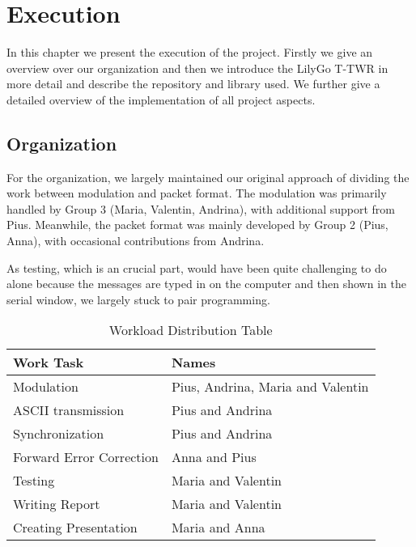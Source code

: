 \chapter{Execution}

In this chapter we present the execution of the project. Firstly we give an overview over our organization and then we introduce the LilyGo T-TWR in more detail and describe the repository and library used. We further give a detailed overview of the implementation of all project aspects.

\section{Organization}
For the organization, we largely maintained our original approach of dividing the work between modulation and packet format. The modulation was primarily handled by Group 3 (Maria, Valentin, Andrina), with additional support from Pius. Meanwhile, the packet format was mainly developed by Group 2 (Pius, Anna), with occasional contributions from Andrina.

As testing, which is an crucial part, would have been quite challenging to do alone because the messages are typed in on the computer and then shown in the serial window, we largely stuck to pair programming. 

\begin{table}[h]
    \centering
    \renewcommand{\arraystretch}{1.3} %
    \begin{tabular}{|p{7cm}|p{7cm}|}
        \hline
        \textbf{Work Task} & \textbf{Names} \\
        \hline
        Modulation & Pius, Andrina, Maria and Valentin \\
        \hline
        ASCII transmission  & Pius and Andrina \\
        \hline
        Synchronization  & Pius and Andrina \\
        \hline
        Forward Error Correction  & Anna and Pius \\
        \hline
        Testing & Maria and Valentin \\
        \hline
        Writing Report & Maria and Valentin \\
        \hline
        Creating Presentation & Maria and Anna \\
        \hline
    \end{tabular}
    \caption{Workload Distribution Table}
    \label{tab:workload}
\end{table}


